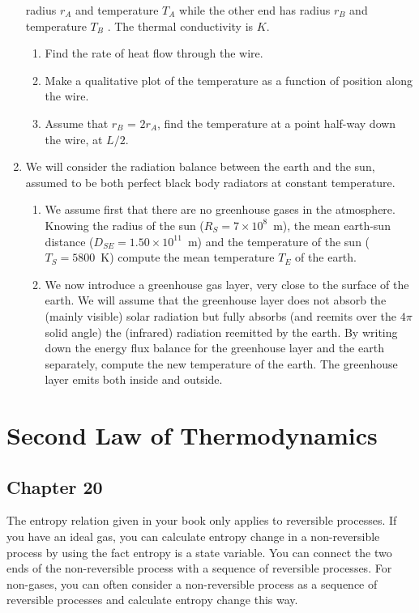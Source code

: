 \documentclass[12pt]{book}
\begin{document}
\begin{enumerate}
radius $r_A$ and temperature $T_A$ while the other end has radius $r_B$ and temperature $T_B$ . The thermal
conductivity is $K$.
\begin{enumerate}
 \item Find the rate of heat flow through the wire.
 \item Make a qualitative plot of the temperature as a function of position along the wire.
 \item Assume that $r_B$ = $2r_A$, find the temperature at a point half-way
down the wire, at $L/2$.
\end{enumerate}
 \item We will consider the radiation balance between the earth and the sun, assumed to be both
perfect black body radiators at constant temperature.
\begin{enumerate}
 \item We assume first that there are no greenhouse gases in the atmosphere.
Knowing the radius of the sun ($R_S=7\times 10^8$~m), the mean earth-sun distance ($D_{SE}=
1.50\times 10^{11}$~m) and the temperature of the sun ($T_S=5800$~K) compute the mean
temperature $T_E$ of the earth.
\item We now introduce a greenhouse gas layer, very close to the surface of
the earth. We will assume that the greenhouse layer does not absorb the (mainly
visible) solar radiation but fully absorbs (and reemits over the $4\pi$ solid angle) the
(infrared) radiation reemitted by the earth. By writing down the energy flux
balance for the greenhouse layer and the earth separately, compute the new
temperature of the earth. The greenhouse layer emits both inside and outside.
\end{enumerate}
\end{enumerate}

\chapter{Second Law of Thermodynamics}

\section{Chapter 20}

The entropy relation given in your book only applies to reversible processes. If you have an ideal gas, you can calculate entropy change in a non-reversible process by using the fact entropy is a state variable. You can connect the two ends of the non-reversible process with a sequence of reversible processes. For non-gases, you can often consider a non-reversible process as a sequence of reversible processes and calculate entropy change this way.
\end{document}
